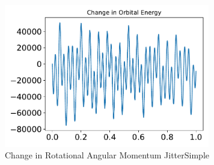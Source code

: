 \begin{figure}[htbp]\centerline{\includegraphics[width=0.80\textwidth]{AutoTeX/ChangeInRotationalAngularMomentumJitterSimple}}\caption{Change in Rotational Angular Momentum JitterSimple}\label{fig:ChangeInRotationalAngularMomentumJitterSimple}\end{figure}